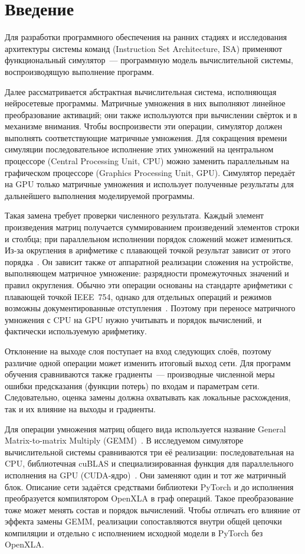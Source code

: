 \section{Введение}
\label{sec:intro}

Для разработки программного обеспечения на ранних стадиях и исследования
архитектуры системы команд (Instruction Set Architecture, ISA)
применяют функциональный симулятор~--- программную модель
вычислительной системы, воспроизводящую выполнение программ.

Далее рассматривается абстрактная вычислительная система,
исполняющая нейросетевые программы. Матричные умножения в них
выполняют линейное преобразование активаций;
они также используются при вычислении свёрток и в механизме внимания.
Чтобы воспроизвести эти операции, симулятор должен выполнять
соответствующие матричные умножения. Для сокращения времени симуляции
последовательное исполнение этих умножений на центральном процессоре
(Central Processing Unit, CPU) можно заменить параллельным
на графическом процессоре (Graphics Processing Unit, GPU).
Симулятор передаёт на GPU только матричные умножения и использует
полученные результаты для дальнейшего выполнения моделируемой программы.

Такая замена требует проверки численного результата.
Каждый элемент произведения матриц получается суммированием
произведений элементов строки и столбца;
при параллельном исполнении порядок сложений может измениться.
Из-за округления в арифметике с плавающей точкой результат зависит
от этого порядка~\cite{Higham2002,Goldberg1991}.
Он зависит также от аппаратной реализации сложения на устройстве,
выполняющем матричное умножение: разрядности промежуточных значений
и правил округления. Обычно эти операции основаны на стандарте арифметики
с плавающей точкой IEEE~754, однако для отдельных операций и режимов
возможны документированные отступления~\cite[разд.~16.3]{CUDA2024}.
Поэтому при переносе матричного умножения с CPU на GPU нужно учитывать
и порядок вычислений, и фактически используемую арифметику.

Отклонение на выходе слоя поступает на вход следующих слоёв,
поэтому различие одной операции может изменить итоговый выход сети.
Для программ обучения сравниваются также градиенты~--- производные
численной меры ошибки предсказания (функции потерь) по входам
и параметрам сети. Следовательно, оценка замены должна охватывать
как локальные расхождения, так и их влияние на выходы и градиенты.

Для операции умножения матриц общего вида используется название
General Matrix-to-matrix Multiply (GEMM)~\cite{cuBLAS2024}.
В исследуемом симуляторе вычислительной системы сравниваются три
её реализации: последовательная на CPU, библиотечная cuBLAS
и специализированная функция для параллельного исполнения на GPU
(CUDA-ядро)~\cite{CUDA2024}. Они заменяют один и тот же матричный блок.
Описание сети задаётся средствами библиотеки PyTorch и до исполнения преобразуется
компилятором OpenXLA в граф операций. Такое преобразование тоже может
менять состав и порядок вычислений. Чтобы отличать его влияние
от эффекта замены GEMM, реализации сопоставляются внутри общей цепочки
компиляции и отдельно с исполнением исходной модели в PyTorch без OpenXLA.

